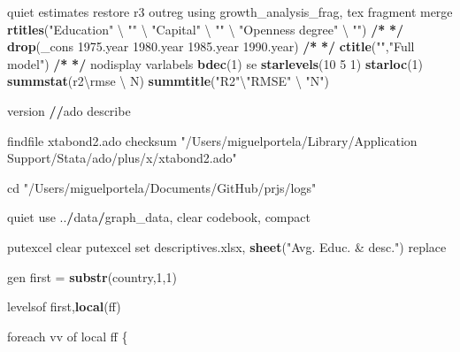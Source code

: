 \documentclass[
  12pt,
]{article}
\newenvironment{Shaded}{\begin{snugshade}}{\end{snugshade}}
\newcommand{\DecValTok}[1]{\textcolor[rgb]{0.00,0.00,0.81}{#1}}
\newcommand{\ErrorTok}[1]{\textcolor[rgb]{0.64,0.00,0.00}{\textbf{#1}}}
\newcommand{\FloatTok}[1]{\textcolor[rgb]{0.00,0.00,0.81}{#1}}
\newcommand{\KeywordTok}[1]{\textcolor[rgb]{0.13,0.29,0.53}{\textbf{#1}}}
\newcommand{\NormalTok}[1]{#1}
\newcommand{\OperatorTok}[1]{\textcolor[rgb]{0.81,0.36,0.00}{\textbf{#1}}}
\newcommand{\StringTok}[1]{\textcolor[rgb]{0.31,0.60,0.02}{#1}}
\begin{document}
\begin{Shaded}
\begin{Highlighting}[]
{\NormalTok{    quiet estimates restore r3}
\NormalTok{        outreg using growth_analysis_frag, tex fragment merge }\KeywordTok{rtitles}\NormalTok{(}\StringTok{"Education"}\NormalTok{ \textbackslash{} }\StringTok{""}\NormalTok{ \textbackslash{} }\StringTok{"Capital"}\NormalTok{ \textbackslash{} }\StringTok{""}\NormalTok{ \textbackslash{} }\StringTok{"Openness degree"}\NormalTok{ \textbackslash{} }\StringTok{""}\NormalTok{)  }\OperatorTok{/}\ErrorTok{*}
\StringTok{                }\ErrorTok{*/}\StringTok{ }\KeywordTok{drop}\NormalTok{(_cons }\FloatTok{1975.}\NormalTok{year }\FloatTok{1980.}\NormalTok{year }\FloatTok{1985.}\NormalTok{year }\FloatTok{1990.}\NormalTok{year) }\OperatorTok{/}\ErrorTok{*}
\StringTok{                }\ErrorTok{*/}\StringTok{ }\KeywordTok{ctitle}\NormalTok{(}\StringTok{""}\NormalTok{,}\StringTok{"Full model"}\NormalTok{) }\OperatorTok{/}\ErrorTok{*}
\StringTok{                }\ErrorTok{*/}\StringTok{ }\NormalTok{nodisplay varlabels }\KeywordTok{bdec}\NormalTok{(}\DecValTok{1}\NormalTok{) se }\KeywordTok{starlevels}\NormalTok{(}\DecValTok{10} \DecValTok{5} \DecValTok{1}\NormalTok{) }\KeywordTok{starloc}\NormalTok{(}\DecValTok{1}\NormalTok{) }\KeywordTok{summstat}\NormalTok{(r2\textbackslash{}rmse \textbackslash{} N) }\KeywordTok{summtitle}\NormalTok{(}\StringTok{"R2"}\NormalTok{\textbackslash{}}\StringTok{"RMSE"}\NormalTok{ \textbackslash{} }\StringTok{"N"}\NormalTok{)}


\NormalTok{version}
\OperatorTok{/}\ErrorTok{/}\NormalTok{ado describe}

\NormalTok{findfile xtabond2.ado}
\NormalTok{checksum }\StringTok{"/Users/miguelportela/Library/Application Support/Stata/ado/plus/x/xtabond2.ado"}

\NormalTok{cd }\StringTok{"/Users/miguelportela/Documents/GitHub/prjs/logs"}

\NormalTok{quiet use ..}\OperatorTok{/}\NormalTok{data}\OperatorTok{/}\NormalTok{graph_data, clear}
\NormalTok{    codebook, compact}

\NormalTok{            putexcel clear}
\NormalTok{            putexcel set descriptives.xlsx, }\KeywordTok{sheet}\NormalTok{(}\StringTok{"Avg. Educ. & desc."}\NormalTok{) replace}
            

\NormalTok{gen first =}\StringTok{ }\KeywordTok{substr}\NormalTok{(country,}\DecValTok{1}\NormalTok{,}\DecValTok{1}\NormalTok{)}

\NormalTok{    levelsof first,}\KeywordTok{local}\NormalTok{(ff)}
    
\NormalTok{    foreach vv of local ff \{}
    
}
\end{Highlighting}
\end{Shaded}
\end{document}

